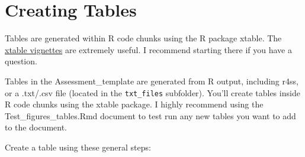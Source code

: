 \documentclass[12pt,]{article}
\begin{document}
\section{Creating Tables}\label{creating-tables}

Tables are generated within R code chunks using the R package xtable.
The
\href{https://cran.r-project.org/web/packages/xtable/index.html}{xtable
vignettes} are extremely useful. I recommend starting there if you have
a question.

Tables in the Assessment\_template are generated from R output,
including r4ss, or a .txt/.csv file (located in the \texttt{txt\_files}
subfolder). You'll create tables inside R code chunks using the xtable
package. I highly recommend using the Test\_figures\_tables.Rmd document
to test run any new tables you want to add to the document.

Create a table using these general steps:
\end{document}
